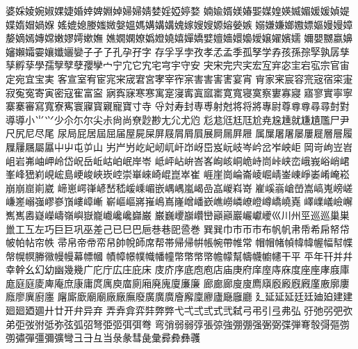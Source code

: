 婆󠄀婇󠄀婈󠄀婉󠄀婌󠄀婐󠄀婕󠄀婚󠄀婞󠄀婢󠄀婣󠄀婥󠄀婦󠄀婦󠄁婧󠄀婪󠄀婬󠄀婭󠄀婷󠄀婺󠄀
婻󠄀婾󠄀婿󠄀媄󠄀媋󠄀媐󠄀媒󠄀媓󠄀媖󠄀媙󠄀媚󠄀媛󠄀媛󠄁媜󠄀媞󠄀媟󠄀媠󠄀媢󠄀媧󠄀媬󠄀
媱󠄀媲󠄀媳󠄀媵󠄀媸󠄀媺󠄀媻󠄀媼󠄀媽󠄀媾󠄀媾󠄁媾󠄂媿󠄀嫁󠄀嫂󠄀嫂󠄁嫄󠄀嫆󠄀嫈󠄀嫉󠄀
嫋󠄀嫌󠄀嫌󠄁嫏󠄀嫐󠄀嫖󠄀嫗󠄀嫚󠄀嫚󠄁嫜󠄀嫠󠄀嫡󠄀嫣󠄀嫥󠄀嫦󠄀嫩󠄀嫪󠄀嫮󠄀嫰󠄀嫵󠄀
嫶󠄀嫺󠄀嫻󠄀嫽󠄀嬀󠄀嬁󠄀嬈󠄀嬉󠄀嬋󠄀嬌󠄀嬖󠄀嬗󠄀嬙󠄀嬛󠄀嬝󠄀嬡󠄀嬢󠄀嬥󠄀嬪󠄀嬬󠄀
嬭󠄀嬰󠄀嬲󠄀嬴󠄀嬶󠄀嬸󠄀嬾󠄀孀󠄀孁󠄀孃󠄀孅󠄀孋󠄀孌󠄀子󠄀孑󠄀孒󠄀孔󠄀孕󠄀孖󠄀字󠄀
存󠄀孚󠄀孚󠄁孛󠄀孜󠄀孝󠄀孞󠄀孟󠄀季󠄀孤󠄀孥󠄀学󠄀孨󠄀孩󠄀孫󠄀孮󠄀孯󠄀孰󠄀孱󠄀孳󠄀
孳󠄁孵󠄀孶󠄀學󠄀孺󠄀孼󠄀孼󠄁孽󠄀孾󠄀孿󠄀宀󠄀宁󠄀宂󠄀它󠄀宄󠄀宅󠄀宆󠄀宇󠄀守󠄀安󠄀
宊󠄀宋󠄀完󠄀宍󠄀宎󠄀宏󠄀宐󠄀宑󠄀宓󠄀宔󠄀宕󠄀宖󠄀宗󠄀官󠄀宙󠄀定󠄀宛󠄀宜󠄀宝󠄀実󠄀
客󠄀宣󠄀室󠄀宥󠄀宦󠄀宨󠄀宩󠄀宬󠄀宭󠄀宮󠄀宯󠄀宰󠄀宱󠄀宲󠄀害󠄀害󠄁害󠄂害󠄃宴󠄀宵󠄀
宵󠄁家󠄀宷󠄀宸󠄀容󠄀宺󠄀宼󠄀宿󠄀寀󠄀寁󠄀寂󠄀寃󠄀寃󠄁寄󠄀寅󠄀密󠄀寇󠄀寉󠄀富󠄀寍󠄀
寎󠄀寏󠄀寐󠄀寒󠄀寒󠄁寓󠄀寔󠄀寖󠄀寗󠄀寘󠄀寙󠄀寚󠄀寛󠄀寛󠄁寝󠄀寞󠄀察󠄀寠󠄀寡󠄀寢󠄀
寤󠄀寥󠄀實󠄀寧󠄀寧󠄁寨󠄀寨󠄁審󠄀寫󠄀寬󠄀寮󠄀寯󠄀寰󠄀寱󠄀寳󠄀寴󠄀寵󠄀寶󠄀寸󠄀寺󠄀
寽󠄀対󠄀寿󠄀封󠄀専󠄀尃󠄀射󠄀尅󠄀将󠄀将󠄁將󠄀專󠄀尉󠄀尊󠄀尊󠄁尊󠄂尋󠄀尋󠄁尌󠄀對󠄀
導󠄀導󠄁小󠄀小󠄁小󠄂少󠄀尒󠄀尓󠄀尔󠄀尖󠄀尗󠄀尙󠄀尚󠄀尞󠄀尟󠄀尠󠄀尢󠄀尣󠄀尤󠄀尦󠄀
尨󠄀尨󠄁尩󠄀尪󠄀尫󠄀尬󠄀尭󠄀尮󠄀尰󠄀就󠄀尲󠄀尵󠄀尶󠄀尸󠄀尹󠄀尺󠄀尻󠄀尼󠄀尽󠄀尾󠄀
尿󠄀局󠄀屁󠄀居󠄀屆󠄀屈󠄀届󠄀屋󠄀屍󠄀屎󠄀屏󠄀屐󠄀屑󠄀屑󠄁屓󠄀展󠄀屙󠄀屚󠄀屛󠄀屜󠄀
属󠄀屟󠄀屠󠄀屠󠄁屡󠄀屢󠄀屣󠄀層󠄀層󠄁履󠄀屧󠄀屨󠄀屩󠄀屬󠄀屭󠄀屮󠄀屮󠄁屯󠄀屰󠄀山󠄀
屴󠄀屵󠄀屶󠄀屹󠄀屺󠄀屻󠄀屼󠄀屽󠄀岇󠄀岈󠄀岊󠄀岌󠄀岏󠄀岐󠄀岑󠄀岒󠄀岔󠄀岝󠄀岟󠄀岠󠄀
岡󠄀岢󠄀岣󠄀岦󠄀岧󠄀岨󠄀岩󠄀岪󠄀岫󠄀岬󠄀岭󠄀岱󠄀岲󠄀岳󠄀岴󠄀岵󠄀岶󠄀岷󠄀岸󠄀岺󠄀
岻󠄀岼󠄀岾󠄀峅󠄀峇󠄀峉󠄀峋󠄀峐󠄀峒󠄀峗󠄀峙󠄀峝󠄀峠󠄀峡󠄀峦󠄀峨󠄀峩󠄀峪󠄀峭󠄀峮󠄀
峯󠄀峰󠄀峱󠄀峲󠄀峴󠄀峵󠄀島󠄀峺󠄀峻󠄀峽󠄀崁󠄀崆󠄀崇󠄀崋󠄀崍󠄀崎󠄀崐󠄀崑󠄀崒󠄀崔󠄀
崕󠄀崖󠄀崗󠄀崘󠄀崙󠄀崚󠄀崛󠄀崝󠄀崟󠄀崠󠄀崢󠄀崣󠄀崤󠄀崦󠄀崧󠄀崩󠄀崩󠄁崫󠄀崱󠄀崴󠄀
崹󠄀崽󠄀崿󠄀嵂󠄀嵃󠄀嵆󠄀嵇󠄀嵈󠄀嵊󠄀嵋󠄀嵌󠄀嵎󠄀嵎󠄁嵐󠄀嵑󠄀嵒󠄀嵓󠄀嵕󠄀嵙󠄀嵜󠄀
嵟󠄀嵠󠄀嵡󠄀嵢󠄀嵤󠄀嵩󠄀嵪󠄀嵬󠄀嵭󠄀嵯󠄀嵰󠄀嵳󠄀嵶󠄀嵹󠄀嵺󠄀嵾󠄀嵿󠄀嶁󠄀嶂󠄀嶃󠄀
嶄󠄀嶇󠄀嶇󠄁嶈󠄀嶊󠄀嶋󠄀嶌󠄀嶐󠄀嶒󠄀嶓󠄀嶔󠄀嶕󠄀嶗󠄀嶙󠄀嶛󠄀嶝󠄀嶟󠄀嶠󠄀嶢󠄀嶤󠄀
嶧󠄀嶫󠄀嶬󠄀嶮󠄀嶰󠄀嶲󠄀嶲󠄁嶴󠄀嶷󠄀嶸󠄀嶹󠄀嶺󠄀嶼󠄀嶽󠄀巃󠄀巇󠄀巉󠄀巉󠄁巋󠄀巌󠄀
巌󠄁巍󠄀巎󠄀巐󠄀巑󠄀巒󠄀巓󠄀巓󠄁巖󠄀巗󠄀巘󠄀巙󠄀巛󠄀川󠄀州󠄀巠󠄀巡󠄀巡󠄁巢󠄀巣󠄀
巤󠄀工󠄀工󠄁左󠄀巧󠄀巨󠄀巨󠄁巩󠄀巫󠄀差󠄀己󠄀已󠄀巳󠄀巴󠄀巵󠄀巷󠄀巷󠄁巸󠄀巹󠄀巻󠄀
巽󠄀巽󠄁巾󠄀巿󠄀帀󠄀市󠄀布󠄀帆󠄀帆󠄁帇󠄀帋󠄀希󠄀帍󠄀帑󠄀帒󠄀帔󠄀帕󠄀帖󠄀帘󠄀帙󠄀
帚󠄀帛󠄀帝󠄀帝󠄁帟󠄀帠󠄀帥󠄀帨󠄀師󠄀席󠄀帮󠄀帯󠄀帰󠄀帰󠄁帲󠄀帳󠄀帵󠄀帶󠄀帷󠄀常󠄀
帽󠄀帽󠄁帾󠄀幀󠄀幃󠄀幃󠄁幄󠄀幅󠄀幇󠄀幉󠄀幋󠄀幌󠄀幎󠄀幐󠄀幑󠄀幔󠄀幔󠄁幕󠄀幖󠄀幗󠄀
幘󠄀幛󠄀幜󠄀幞󠄀幟󠄀幡󠄀幢󠄀幣󠄀幣󠄁幤󠄀幤󠄁幨󠄀幪󠄀幫󠄀幬󠄀幭󠄀幮󠄀幰󠄀干󠄀平󠄀
平󠄁年󠄀幵󠄀并󠄀幷󠄀幸󠄀幹󠄀幺󠄀幻󠄀幼󠄀幽󠄀幾󠄀幾󠄁广󠄀庀󠄀庁󠄀広󠄀庄󠄀庇󠄀床󠄀
庋󠄀庎󠄀序󠄀底󠄀庖󠄀庖󠄁店󠄀庙󠄀庚󠄀府󠄀庠󠄀庢󠄀庤󠄀庥󠄀度󠄀座󠄀座󠄁庨󠄀庪󠄀庫󠄀
庬󠄀庭󠄀庭󠄁庱󠄀庳󠄀庵󠄀庶󠄀康󠄀庸󠄀庹󠄀庽󠄀庾󠄀庿󠄀廁󠄀廂󠄀廃󠄀廆󠄀廈󠄀廉󠄀廉󠄁
廊󠄀廊󠄁廊󠄂廋󠄀廋󠄁廌󠄀廎󠄀廏󠄀廏󠄁廐󠄀廐󠄁廑󠄀廒󠄀廓󠄀廔󠄀廕󠄀廖󠄀廙󠄀廚󠄀廛󠄀
廜󠄀廝󠄀廞󠄀廟󠄀廟󠄁廠󠄀廠󠄁廡󠄀廢󠄀廣󠄀廣󠄁廣󠄂廥󠄀廨󠄀廩󠄀廫󠄀廬󠄀廰󠄀廱󠄀廳󠄀
廴󠄀延󠄀延󠄁延󠄂廷󠄀廷󠄁廸󠄀廹󠄀建󠄀建󠄁廻󠄀廻󠄁廼󠄀廽󠄀廾󠄀廿󠄀开󠄀弁󠄀异󠄀弃󠄀
弄󠄀弆󠄀弇󠄀弈󠄀弉󠄀弊󠄀弊󠄁弋󠄀弌󠄀弍󠄀弎󠄀式󠄀弐󠄀弑󠄀弓󠄀弔󠄀引󠄀弖󠄀弗󠄀弘󠄀
弙󠄀弛󠄀弜󠄀弝󠄀弞󠄀弟󠄀弡󠄀弢󠄀弣󠄀弤󠄀弥󠄀弦󠄀弧󠄀弨󠄀弩󠄀弫󠄀弬󠄀弭󠄀弭󠄁弮󠄀
弯󠄀弰󠄀弱󠄀弱󠄁弴󠄀張󠄀弶󠄀強󠄀弸󠄀弸󠄁强󠄀弻󠄀弼󠄀弽󠄀弾󠄀弿󠄀彀󠄀彁󠄀彄󠄀彅󠄀
彅󠄁彇󠄀彈󠄀彊󠄀彌󠄀彍󠄀彎󠄀彐󠄀彐󠄁彑󠄀当󠄀彔󠄀彖󠄀彗󠄀彘󠄀彙󠄀彛󠄀彜󠄀彝󠄀彠󠄀
